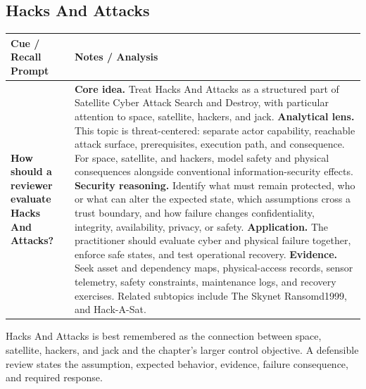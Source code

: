 \documentclass[11pt]{article}
\newcommand{\CornellHeader}{%
\rowcolor{Navy}\color{white}\bfseries Cue / Recall Prompt & \color{white}\bfseries Notes / Analysis\\\hline}
\newcommand{\CornellRow}[2]{%
\cellcolor{CueGray}\RaggedRight\textbf{#1} & \RaggedRight #2\\\hline}
\begin{document}
\subsection*{Hacks And Attacks}
\begin{longtable}{>{\RaggedRight\arraybackslash}p{}|>{\RaggedRight\arraybackslash}p{}}
\CornellHeader
\CornellRow{How should a reviewer evaluate Hacks And Attacks?}{\textbf{Core idea.} Treat Hacks And Attacks as a structured part of Satellite Cyber Attack Search and Destroy, with particular attention to space, satellite, hackers, and jack. \textbf{Analytical lens.} This topic is threat-centered: separate actor capability, reachable attack surface, prerequisites, execution path, and consequence. For space, satellite, and hackers, model safety and physical consequences alongside conventional information-security effects. \textbf{Security reasoning.} Identify what must remain protected, who or what can alter the expected state, which assumptions cross a trust boundary, and how failure changes confidentiality, integrity, availability, privacy, or safety. \textbf{Application.} The practitioner should evaluate cyber and physical failure together, enforce safe states, and test operational recovery. \textbf{Evidence.} Seek asset and dependency maps, physical-access records, sensor telemetry, safety constraints, maintenance logs, and recovery exercises. Related subtopics include The Skynet Ransomd1999, and Hack-A-Sat.}
\end{longtable}
\begin{topicsummary}
Hacks And Attacks is best remembered as the connection between space, satellite, hackers, and jack and the chapter's larger control objective. A defensible review states the assumption, expected behavior, evidence, failure consequence, and required response.
\end{topicsummary}
\end{document}
